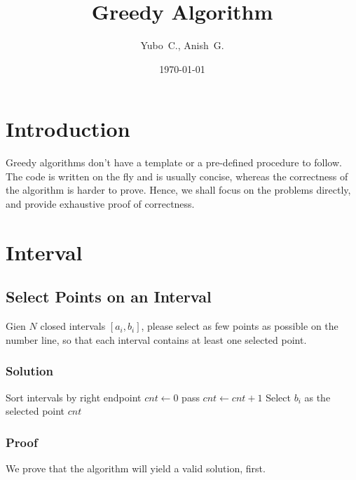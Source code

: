\documentclass{article}
\title{Greedy Algorithm}
\date{\today}
\author{Yubo~C., Anish~G.}
\begin{document}
\maketitle

\newpage

\section{Introduction}

Greedy algorithms don't have a template or a pre-defined procedure to follow.
The code is written on the fly and is usually concise, whereas the correctness of the algorithm is harder to prove.
Hence, we shall focus on the problems directly, and provide exhaustive proof of correctness.

\section{Interval}

\subsection{Select Points on an Interval}

Gien $N$ closed intervals $[a_i,b_i]$, please select as few points as possible on the number line, so that each interval contains at least one selected point.

\subsubsection{Solution}

\begin{algorithm}[H]
    \BlankLine
    Sort intervals by right endpoint\;
    $cnt \gets 0$\;
    {
        {
            pass\;
        }
        \Else
        {
            $cnt \gets cnt + 1$\;
            Select $b_i$ as the selected point\;
        }
    }
    \Return $cnt$\;
\end{algorithm}

\subsubsection{Proof}

We prove that the algorithm will yield a valid solution, first.
\end{document}

